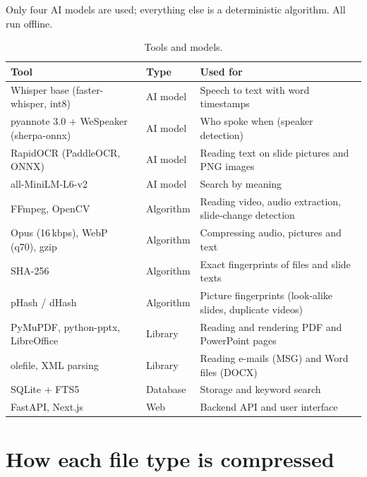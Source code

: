 \documentclass[11pt,a4paper]{article}
\begin{document}
Only four AI models are used; everything else is a deterministic algorithm. All run offline.

\begin{table}[H]
\centering
\small
\begin{tabularx}{\textwidth}{@{}l l X@{}}
\toprule
\textbf{Tool} & \textbf{Type} & \textbf{Used for} \\
\midrule
Whisper base (faster-whisper, int8) & AI model & Speech to text with word timestamps \\
pyannote 3.0 + WeSpeaker (sherpa-onnx) & AI model & Who spoke when (speaker detection) \\
RapidOCR (PaddleOCR, ONNX) & AI model & Reading text on slide pictures and PNG images \\
all-MiniLM-L6-v2 & AI model & Search by meaning \\
FFmpeg, OpenCV & Algorithm & Reading video, audio extraction, slide-change detection \\
Opus (16\,kbps), WebP (q70), gzip & Algorithm & Compressing audio, pictures and text \\
SHA-256 & Algorithm & Exact fingerprints of files and slide texts \\
pHash / dHash & Algorithm & Picture fingerprints (look-alike slides, duplicate videos) \\
PyMuPDF, python-pptx, LibreOffice & Library & Reading and rendering PDF and PowerPoint pages \\
olefile, XML parsing & Library & Reading e-mails (MSG) and Word files (DOCX) \\
SQLite + FTS5 & Database & Storage and keyword search \\
FastAPI, Next.js & Web & Backend API and user interface \\
\bottomrule
\end{tabularx}
\caption{Tools and models.}
\end{table}

\section{How each file type is compressed}
\end{document}
